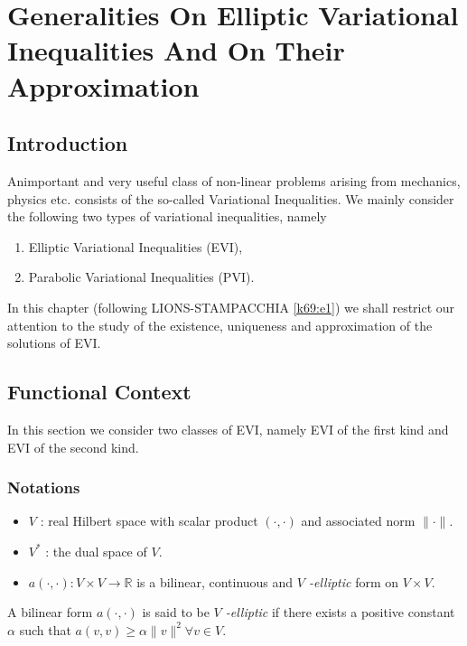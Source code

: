 
\chapter[Generalities On Elliptic Variational...]{Generalities On Elliptic Variational 
Inequalities And On Their Approximation}\label{chap1}

\section{Introduction}\label{c1:s1}

 An\pageoriginale important and very useful class of non-linear problems arising
 from mechanics, physics etc. consists of the so-called Variational
 Inequalities. We mainly consider the following two types of
 variational inequalities, namely 
\begin{enumerate}
\item Elliptic Variational Inequalities (EVI),
\item Parabolic Variational Inequalities (PVI).
\end{enumerate}

In this chapter (following LIONS-STAMPACCHIA \ref{k69:e1}) we shall restrict
our attention to the study of the existence, uniqueness and
approximation of the solutions of EVI. 

\section{Functional Context}\label{c1:s2}

 In this section we consider two classes of EVI, namely EVI of the
 first kind and EVI of the second kind. 

\subsection{Notations}\label{c1:ss2.1}
\begin{itemize}
\item $V$ : real Hilbert space with scalar product $(\cdot , \cdot)$ and
  associated norm $\parallel \cdot \parallel$. 
\item $V^*$ : the dual space of $V$.
\item $a(\cdot , \cdot) : V \times V \to \mathbb{R}$ is a bilinear, continuous
  and \textit{$V$ -elliptic} form on $V \times V$.  
\end{itemize}

A bilinear form $a (\cdot , \cdot)$ is said to be \textit{$V$ -elliptic} if
there exists a positive constant $\alpha$ such that $a(v, v) \geq
\alpha \parallel v \parallel^2 \forall v \in V$.  

